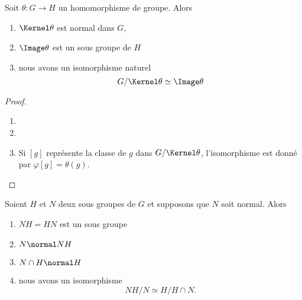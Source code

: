 \begin{theorem}        \label{ThoPremierthoisomo}
    Soit \( \theta\colon G\to H\) un homomorphisme de groupe. Alors
    \begin{enumerate}
        \item
            \( \Kernel\theta\) est normal dans \( G\),
        \item
            \( \Image \theta\) est un sous groupe de \( H\)
        \item   \label{ItemWLCLdk}
            nous avons un isomorphisme naturel
            \begin{equation}
                G/\Kernel\theta\simeq \Image\theta
            \end{equation}
    \end{enumerate}
\end{theorem}

\begin{proof}
    \begin{enumerate}
        \item
        \item
        \item
            Si \( [g]\) représente la classe de \( g\) dans \( G/\Kernel\theta\), l'isomorphisme est donné par \( \varphi[g]=\theta(g)\).
    \end{enumerate}
\end{proof}


\begin{theorem}
    Soient \( H\) et \( N\) deux sous groupes de \( G\) et supposons que \( N\) soit normal. Alors
    \begin{enumerate}
        \item
            \( NH=HN\) est un sous groupe
        \item
            \( N\normal NH\)
        \item
            \( N\cap H\normal H\)
        \item
            nous avons un isomorphisme
            \begin{equation}
                NH/N\simeq H/H\cap N.
            \end{equation}
    \end{enumerate}
\end{theorem}

